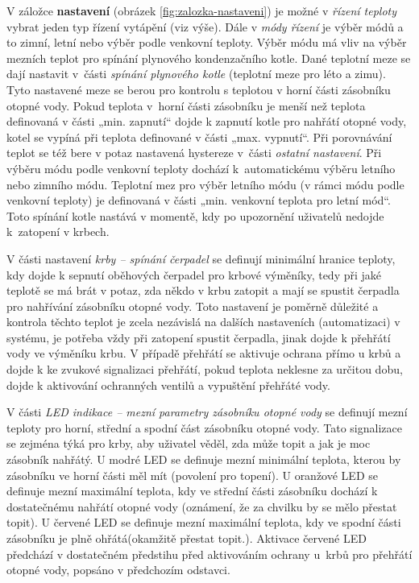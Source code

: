 V záložce \textbf{nastavení} (obrázek \ref{fig:zalozka-nastaveni}) je možné v \textit{řízení teploty} vybrat jeden typ řízení vytápění (viz výše). Dále v \textit{módy řízení} je výběr módů a to zimní, letní nebo výběr podle venkovní teploty. Výběr módu má vliv na výběr mezních teplot pro spínání plynového kondenzačního kotle. Dané teplotní meze se dají nastavit v~části \textit{spínání plynového kotle} (teplotní meze pro léto a zimu). Tyto nastavené meze se berou pro kontrolu s teplotou v horní části zásobníku otopné vody. Pokud teplota v~horní části zásobníku je menší než teplota definovaná v části „min. zapnutí“ dojde k zapnutí kotle pro nahřátí otopné vody, kotel se vypíná při teplota definované v části „max. vypnutí“. Při porovnávání teplot se též bere v potaz nastavená hystereze v~části \textit{ostatní nastavení}. Při výběru módu podle venkovní teploty dochází k~automatickému výběru letního nebo zimního módu. Teplotní mez pro výběr letního módu (v rámci módu podle venkovní teploty) je definovaná v části „min. venkovní teplota pro letní mód“. Toto spínání kotle nastává v momentě, kdy po upozornění uživatelů nedojde k~zatopení v krbech.


V části nastavení \textit{krby – spínání čerpadel} se definují minimální hranice teploty, kdy dojde k sepnutí oběhových čerpadel pro krbové výměníky, tedy při jaké teplotě se má brát v potaz, zda někdo v krbu zatopit a mají se spustit čerpadla pro nahřívání zásobníku otopné vody. Toto nastavení je poměrně důležité a kontrola těchto teplot je zcela nezávislá na dalších nastaveních (automatizaci) v systému, je potřeba vždy při zatopení spustit čerpadla, jinak dojde k přehřátí vody ve výměníku krbu. V případě přehřátí se aktivuje ochrana přímo u krbů a dojde k ke zvukové signalizaci přehřátí, pokud teplota neklesne za určitou dobu, dojde k aktivování ochranných ventilů a vypuštění přehřáté vody.


V části \textit{LED indikace – mezní parametry zásobníku otopné vody} se definují mezní teploty pro horní, střední a spodní část zásobníku otopné vody. Tato signalizace se zejména týká pro krby, aby uživatel věděl, zda může topit a jak je moc zásobník nahřátý. U modré LED se definuje mezní minimální teplota, kterou by zásobníku ve horní části měl mít (povolení pro topení). U oranžové LED se definuje mezní maximální teplota, kdy ve střední části zásobníku dochází k dostatečnému nahřátí otopné vody (oznámení, že za chvilku by se mělo přestat topit). U červené LED se definuje mezní maximální teplota, kdy ve spodní části zásobníku je plně ohřátá(okamžitě přestat topit.). Aktivace červené LED předchází v dostatečném předstihu před aktivováním ochrany u~krbů pro přehřátí otopné vody, popsáno v předchozím odstavci.

